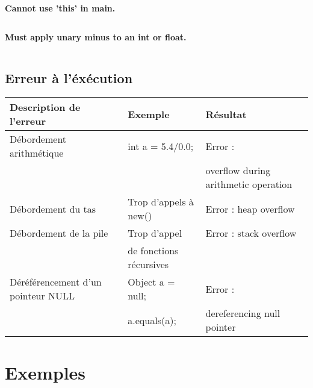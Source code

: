 \documentclass[a4,12pt]{article}
\begin{document}
\begin{lstlisting}

\end{lstlisting}




\textbf{Cannot use 'this' in main.}\\

\begin{lstlisting}

\end{lstlisting}




\textbf{Must apply unary minus to an int or float.}\\

\begin{lstlisting}

\end{lstlisting}



\subsection{Erreur à l'éxécution}
\begin{tabular}{|l|l|l|}
\hline
   Description de l'erreur & Exemple & Résultat \\
   \hline
   Débordement arithmétique & int a = 5.4/0.0; & Error :  \\
      &  & overflow during arithmetic operation \\
   \hline
   Débordement du tas & Trop d'appels à new() & Error : heap overflow \\
   \hline
   Débordement de la pile & Trop d'appel& Error : stack overflow \\
         & de fonctions récursives &\\
   
   \hline
   Déréférencement d'un pointeur NULL & Object a = null;  & Error :  \\
   & a.equals(a); & dereferencing null pointer \\
   \hline
\end{tabular}

\section{Exemples}
\end{document}
